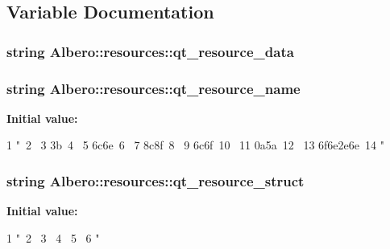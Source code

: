 \subsection{Variable Documentation}
\hypertarget{namespaceAlbero_1_1resources_aa2ca3975dada28c52119cbc990507ad2}{
\subsubsection[{qt\_\-resource\_\-data}]{\setlength{\rightskip}{0pt plus 5cm}string {\bf Albero::resources::qt\_\-resource\_\-data}}}
\label{namespaceAlbero_1_1resources_aa2ca3975dada28c52119cbc990507ad2}
\hypertarget{namespaceAlbero_1_1resources_a0de85fc01ee82b4c93eda6188dd6cd6c}{
\subsubsection[{qt\_\-resource\_\-name}]{\setlength{\rightskip}{0pt plus 5cm}string {\bf Albero::resources::qt\_\-resource\_\-name}}}
\label{namespaceAlbero_1_1resources_a0de85fc01ee82b4c93eda6188dd6cd6c}
{\bfseries Initial value:}
\begin{DoxyCode}
1 "\
2 \
3 \x3b\
4 \
5 \x6c\x6e\
6 \
7 \x8c\x8f\
8 \
9 \x6c\x6f\
10 \
11 \x0a\x5a\
12 \
13 \x6f\x6e\x2e\x6e\
14 "
\end{DoxyCode}
\hypertarget{namespaceAlbero_1_1resources_a2a80e241c281cf6718630921b7f2885a}{
\subsubsection[{qt\_\-resource\_\-struct}]{\setlength{\rightskip}{0pt plus 5cm}string {\bf Albero::resources::qt\_\-resource\_\-struct}}}
\label{namespaceAlbero_1_1resources_a2a80e241c281cf6718630921b7f2885a}
{\bfseries Initial value:}
\begin{DoxyCode}
1 "\
2 \x00\
3 \
4 \
5 \
6 "
\end{DoxyCode}
